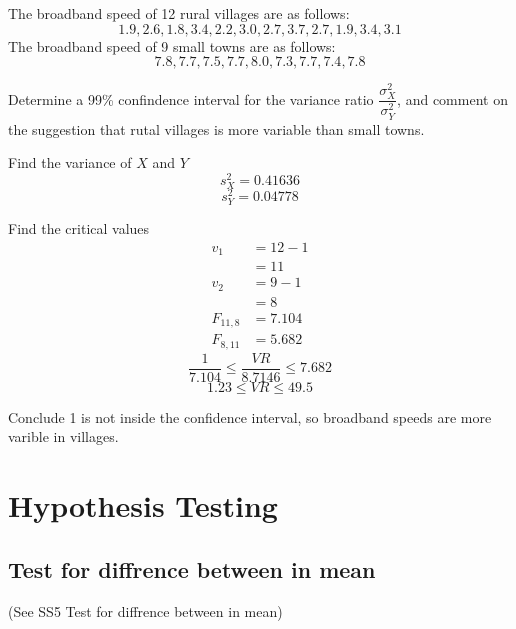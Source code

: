          \begin{example}
         {
             The broadband speed of 12 rural villages are as follows:
             $$1.9, 2.6, 1.8, 3.4, 2.2, 3.0, 2.7, 3.7, 2.7, 1.9, 3.4, 3.1$$
             The broadband speed of 9 small towns are as follows:
             $$7.8, 7.7, 7.5, 7.7, 8.0, 7.3, 7.7, 7.4, 7.8$$

             Determine a 99\% confindence interval for the variance ratio $\dfrac{\sigma_X^2}{\sigma_Y^2}$, and comment on the suggestion that rutal villages is more variable than small towns.
         }
         
         \begin{step}{Find the variance of $X$ and $Y$}
            $$s_X^2 = 0.41636$$
            $$s_Y^2 = 0.04778$$
         \end{step}

         \begin{step}{Find the critical values}
            \begin{align*}
            v_1       &= 12 - 1   \\
                      &= 11       \\
            v_2       &= 9 - 1    \\
                      &= 8        \\
            F_{11, 8} &= 7.104    \\
            F_{8, 11} &= 5.682
            \end{align*}
            $$\dfrac{1}{7.104} \leq \dfrac{VR}{8.7146} \leq 7.682$$
            $$1.23 \leq VR \leq 49.5$$
         \end{step}

         \begin{step}{Conclude}
            1 is not inside the confidence interval, so broadband speeds are more varible in villages.
         \end{step}

         \end{example}

\section{Hypothesis Testing}
    \subsection{Test for diffrence between in mean}
        (See SS5 Test for diffrence between in mean)

